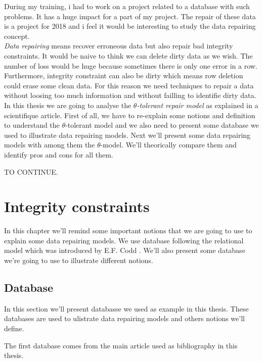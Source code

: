 \documentclass[letterpaper, 12pt]{report}
\begin{document}
During my training, i had to work on a project related to a database with such problems. It has a huge impact for a part of my project. The repair of these data is a project for 2018 and i feel it would be interesting to study the data repairing concept.\\

\emph{Data repairing} means recover erroneous data but also repair bad integrity constraints. It would be naive to think we can delete dirty data as we wish. The number of loss would be huge because sometimes there is only one error in a row. Furthermore, integrity constraint can also be dirty which means row deletion could erase some clean data. For this reason we need techniques to repair a data without loosing too much information and without failling to identifie dirty data. \\

In this thesis we are going to analyse the \emph{$\theta$-tolerant repair model} as explained in a scientifique article\cite{main}. First of all, we have to re-explain some notions and definition to understand the $\theta$-tolerant model and we also need to present some database we used to illustrate data repairing models. Next we'll present some data repairing models with among them the $\theta$-model. We'll theorically compare them and identify pros and cons for all them.

TO CONTINUE.

\chapter{Integrity constraints}

In this chapter we'll remind some important notions that we are going to use to explain some data repairing models. We use database following the relational model which was introduced by E.F. Codd \cite{misc1}. We'll also present some database we're going to use to illustrate different notions.
\section{Database}

In this section we'll present databasse we used as example in this thesis. These databases are used to ulistrate data repairing models and others notions we'll  define.

The first database comes from the main article used as bibliography in this thesis\cite{main}.
\end{document}
